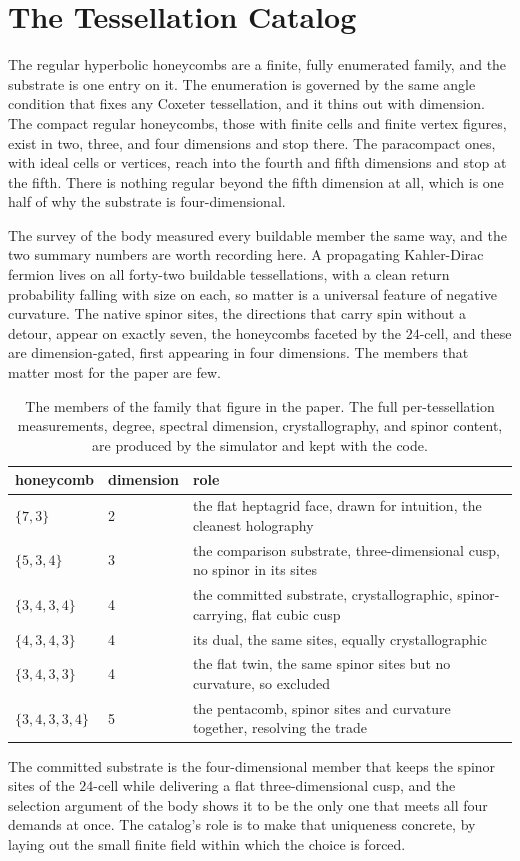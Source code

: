 \section{The Tessellation Catalog}
\label{app:catalog}

The regular hyperbolic honeycombs are a finite, fully enumerated family, and the substrate is one entry on it. The enumeration is governed by the same angle condition that fixes any Coxeter tessellation, and it thins out with dimension. The compact regular honeycombs, those with finite cells and finite vertex figures, exist in two, three, and four dimensions and stop there. The paracompact ones, with ideal cells or vertices, reach into the fourth and fifth dimensions and stop at the fifth. There is nothing regular beyond the fifth dimension at all, which is one half of why the substrate is four-dimensional.

The survey of the body measured every buildable member the same way, and the two summary numbers are worth recording here. A propagating Kahler-Dirac fermion lives on all forty-two buildable tessellations, with a clean return probability falling with size on each, so matter is a universal feature of negative curvature. The native spinor sites, the directions that carry spin without a detour, appear on exactly seven, the honeycombs faceted by the $24$-cell, and these are dimension-gated, first appearing in four dimensions. The members that matter most for the paper are few.

\begin{table}[ht]
\centering
\small
\begin{tabular}{@{}llp{}@{}}
\toprule
honeycomb & dimension & role \\
\midrule
$\{7,3\}$ & 2 & the flat heptagrid face, drawn for intuition, the cleanest holography \\
$\{5,3,4\}$ & 3 & the comparison substrate, three-dimensional cusp, no spinor in its sites \\
$\{3,4,3,4\}$ & 4 & the committed substrate, crystallographic, spinor-carrying, flat cubic cusp \\
$\{4,3,4,3\}$ & 4 & its dual, the same sites, equally crystallographic \\
$\{3,4,3,3\}$ & 4 & the flat twin, the same spinor sites but no curvature, so excluded \\
$\{3,4,3,3,4\}$ & 5 & the pentacomb, spinor sites and curvature together, resolving the trade \\
\bottomrule
\end{tabular}
\caption{The members of the family that figure in the paper. The full per-tessellation measurements, degree, spectral dimension, crystallography, and spinor content, are produced by the simulator and kept with the code.}
\label{tab:catalog}
\end{table}

The committed substrate is the four-dimensional member that keeps the spinor sites of the $24$-cell while delivering a flat three-dimensional cusp, and the selection argument of the body shows it to be the only one that meets all four demands at once. The catalog's role is to make that uniqueness concrete, by laying out the small finite field within which the choice is forced.
